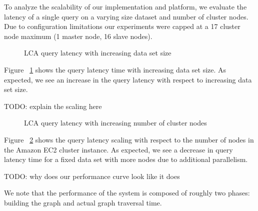 \documentclass{article}
\begin{document}
To analyze the scalability of our implementation and platform, we evaluate the latency of a single query on a varying size dataset and number of cluster nodes.
Due to configuration limitations our experiments were capped at a 17 cluster node maximum (1 master node, 16 slave nodes).

\begin{figure}
\centering


\caption{LCA query latency with increasing data set size}
\label{latency_scaling}
\end{figure}

Figure ~\ref{latency_scaling} shows the query latency time with increasing data set size.
As expected, we see an increase in the query latency with respect to increasing data set size. 

TODO: explain the scaling here

\begin{figure}
\centering



\caption{LCA query latency with increasing number of cluster nodes}
\label{node_scaling}
\end{figure}

Figure ~\ref{node_scaling} shows the query latency scaling with respect to the number of nodes in the Amazon EC2 cluster instance.
As expected, we see a decrease in query latency time for a fixed data set with more nodes due to additional parallelism.


TODO: why does our performance curve look like it does

We note that the performance of the system is composed of roughly two phases: building the graph and actual graph traversal time.
\end{document}
